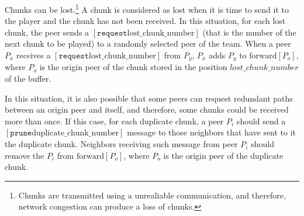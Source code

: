 
\label{sec:overlay_organization}

Chunks can be lost.\footnote{Chunks are transmitted using a
  unrealiable communication, and therefore, network congestion can
  produce a loss of chunks.} A chunk is considered as lost when it is
time to send it to the player and the chunk has not been received.  In
this situation, for each lost chunk, the peer sends a
$[\mathtt{request} \text{lost\_chunk\_number}]$ (that is the number of
the next chunk to be played) to a randomly selected peer of the
team. When a peer $P_x$ receives a $[\mathtt{request}
  \text{lost\_chunk\_number}]$ from $P_y$, $P_x$ adds $P_y$ to
$\text{forward}[P_o]$, where $P_o$ is the origin peer of the chunk
stored in the position $lost\_chunk\_number$ of the buffer.

\begin{comment}
origin peer of the next chunk stored in the
buffer. This peer has to characteristics: (1) it is not necessary a
neighbor peer, and (2) there is a high probability that this chunk has
been stored in the buffer ``for a long time'', so, if it is not a
neighbor, the link between it and the peer is working fairly well.
\end{comment}

  
In this situation, it is also possible that some peers can request
redundant paths between an origin peer and itself, and therefore, some
chunks could be received more than once. If this case, for each
duplicate chunk, a peer $P_i$ should send a $[\mathtt{prune}
  \text{duplicate\_chunk\_number}]$ message to those neighbors that
have sent to it the duplicate chunk. Neighbors receiving such message
from peer $P_i$ should remove the $P_i$ from $\text{forward}[P_o]$,
where $P_o$ is the origin peer of the duplicate chunk.

